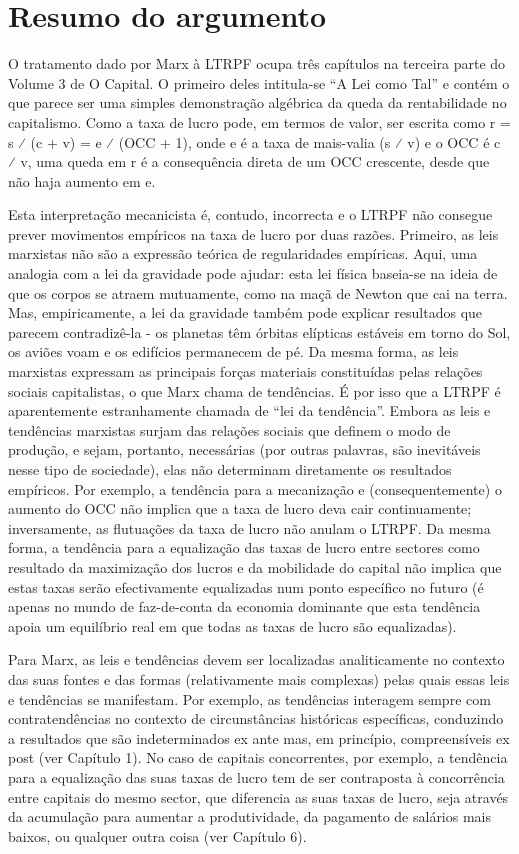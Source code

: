 \section{Resumo do argumento}
 \par 
O tratamento dado por Marx à LTRPF ocupa três capítulos na terceira parte do Volume {\color{blue}3} de O Capital. O primeiro deles intitula-se “A Lei como Tal” e contém o que parece ser uma simples demonstração algébrica da queda da rentabilidade no capitalismo. Como a taxa de lucro pode, em termos de valor, ser escrita como r = s ⁄ (c + v) = e ⁄ (OCC + {\color{blue}1}), onde e é a taxa de mais-valia (s ⁄ v) e o OCC é c ⁄ v, uma queda em r é a consequência direta de um OCC crescente, desde que não haja aumento em e.
 \par 
Esta interpretação mecanicista é, contudo, incorrecta e o LTRPF não consegue prever movimentos empíricos na taxa de lucro por duas razões. Primeiro, as leis marxistas não são a expressão teórica de regularidades empíricas. Aqui, uma analogia com a lei da gravidade pode ajudar: esta lei física baseia-se na ideia de que os corpos se atraem mutuamente, como na maçã de Newton que cai na terra. Mas, empiricamente, a lei da gravidade também pode explicar resultados que parecem contradizê-la - os planetas têm órbitas elípticas estáveis ​​em torno do Sol, os aviões voam e os edifícios permanecem de pé. Da mesma forma, as leis marxistas expressam as principais forças materiais constituídas pelas relações sociais capitalistas, o que Marx chama de tendências. É por isso que a LTRPF é aparentemente estranhamente chamada de “lei da tendência”. Embora as leis e tendências marxistas surjam das relações sociais que definem o modo de produção, e sejam, portanto, necessárias (por outras palavras, são inevitáveis ​​nesse tipo de sociedade), elas não determinam diretamente os resultados empíricos. Por exemplo, a tendência para a mecanização e (consequentemente) o aumento do OCC não implica que a taxa de lucro deva cair continuamente; inversamente, as flutuações da taxa de lucro não anulam o LTRPF. Da mesma forma, a tendência para a equalização das taxas de lucro entre sectores como resultado da maximização dos lucros e da mobilidade do capital não implica que estas taxas serão efectivamente equalizadas num ponto específico no futuro (é apenas no mundo de faz-de-conta da economia dominante que esta tendência apoia um equilíbrio real em que todas as taxas de lucro são equalizadas).
 \par 
Para Marx, as leis e tendências devem ser localizadas analiticamente no contexto das suas fontes e das formas (relativamente mais complexas) pelas quais essas leis e tendências se manifestam. Por exemplo, as tendências interagem sempre com contratendências no contexto de circunstâncias históricas específicas, conduzindo a resultados que são indeterminados ex ante mas, em princípio, compreensíveis ex post (ver Capítulo {\color{blue}1}). No caso de capitais concorrentes, por exemplo, a tendência para a equalização das suas taxas de lucro tem de ser contraposta à concorrência entre capitais do mesmo sector, que diferencia as suas taxas de lucro, seja através da acumulação para aumentar a produtividade, da pagamento de salários mais baixos, ou qualquer outra coisa (ver Capítulo {\color{blue}6}).
